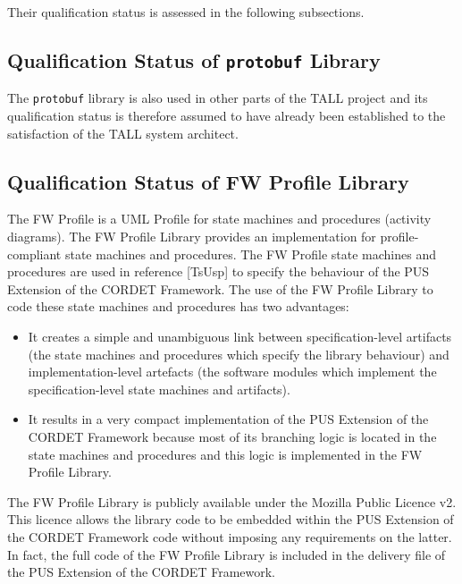 \documentclass{pnp_article}
\begin{document}
Their qualification status is assessed in the following subsections.

\subsection{Qualification Status of \texttt{protobuf} Library}
The \texttt{protobuf} library is also used in other parts of the TALL project and its qualification status is therefore assumed to have already been established to the satisfaction of the TALL system architect. 

\subsection{Qualification Status of FW Profile Library}
The FW Profile is a UML Profile for state machines and procedures (activity diagrams). The FW Profile Library provides an implementation for profile-compliant state machines and procedures. The FW Profile state machines and procedures are used in reference [TsUsp] to specify the behaviour of the PUS Extension of the CORDET Framework. The use of the FW Profile Library to code these state machines and procedures has two advantages:

\begin{itemize}
\item It creates a simple and unambiguous link between specification-level artifacts (the state machines and procedures which specify the library behaviour) and implementation-level artefacts (the software modules which implement the specification-level state machines and artifacts).
\item It results in a very compact implementation of the PUS Extension of the CORDET Framework because most of its branching logic is located in the state machines and procedures and this logic is implemented in the FW Profile Library. 
\end{itemize}

The FW Profile Library is publicly available under the Mozilla Public Licence v2. This licence allows the library code to be embedded within the PUS Extension of the CORDET Framework code without imposing any requirements on the latter. In fact, the full code of the FW Profile Library is included in the delivery file of the PUS Extension of the CORDET Framework.
\end{document}
